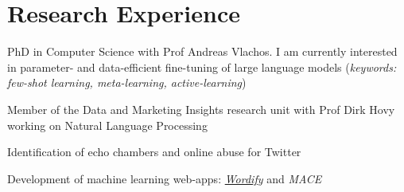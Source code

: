 \documentclass[]{deedy-resume-reversed}
\begin{document}
%
%

%
%

%
%

\begin{minipage}[t]{0.60\textwidth}



\section{Research Experience}

\vspace{\topsep}
\begin{tightemize}
\item PhD in Computer Science with Prof Andreas Vlachos. I am currently interested in parameter- and data-efficient fine-tuning of large language models (\textit{keywords: few-shot learning, meta-learning, active-learning})
\end{tightemize}
\sectionsep

\begin{tightemize}
\item Member of the Data and Marketing Insights research unit with Prof Dirk Hovy working on Natural Language Processing
\item Identification of echo chambers and online abuse for Twitter
\item Development of machine learning web-apps: \href{https://wordify.unibocconi.it/}{\it Wordify} and \textit{MACE}
\end{tightemize}
\sectionsep



\end{minipage}
\end{document}
